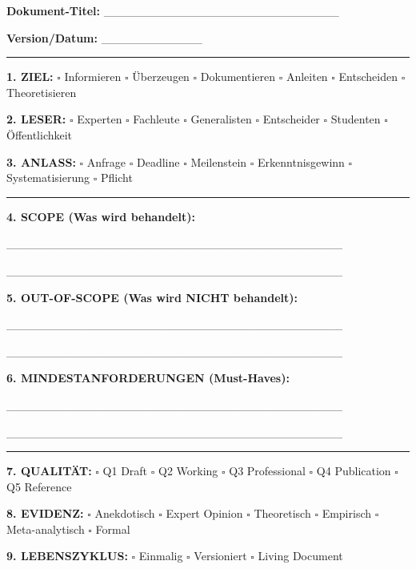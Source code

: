 \documentclass[12pt,a4paper]{article}
\begin{document}
\begin{tcolorbox}[colback=gray!10!white, colframe=black, 
    title=DOCUMENT SPECIFICATION CARD (Template)]

\textbf{Dokument-Titel:} \_\_\_\_\_\_\_\_\_\_\_\_\_\_\_\_\_\_\_\_\_\_\_\_\_\_\_\_

\textbf{Version/Datum:} \_\_\_\_\_\_\_\_\_\_\_\_

\rule{\textwidth}{0.3pt}

\textbf{1. ZIEL:} $\square$ Informieren $\square$ Überzeugen $\square$ Dokumentieren 
$\square$ Anleiten $\square$ Entscheiden $\square$ Theoretisieren

\textbf{2. LESER:} $\square$ Experten $\square$ Fachleute $\square$ Generalisten 
$\square$ Entscheider $\square$ Studenten $\square$ Öffentlichkeit

\textbf{3. ANLASS:} $\square$ Anfrage $\square$ Deadline $\square$ Meilenstein 
$\square$ Erkenntnisgewinn $\square$ Systematisierung $\square$ Pflicht

\rule{\textwidth}{0.3pt}

\textbf{4. SCOPE (Was wird behandelt):}

\_\_\_\_\_\_\_\_\_\_\_\_\_\_\_\_\_\_\_\_\_\_\_\_\_\_\_\_\_\_\_\_\_\_\_\_\_\_\_\_

\_\_\_\_\_\_\_\_\_\_\_\_\_\_\_\_\_\_\_\_\_\_\_\_\_\_\_\_\_\_\_\_\_\_\_\_\_\_\_\_

\textbf{5. OUT-OF-SCOPE (Was wird NICHT behandelt):}

\_\_\_\_\_\_\_\_\_\_\_\_\_\_\_\_\_\_\_\_\_\_\_\_\_\_\_\_\_\_\_\_\_\_\_\_\_\_\_\_

\_\_\_\_\_\_\_\_\_\_\_\_\_\_\_\_\_\_\_\_\_\_\_\_\_\_\_\_\_\_\_\_\_\_\_\_\_\_\_\_

\textbf{6. MINDESTANFORDERUNGEN (Must-Haves):}

\_\_\_\_\_\_\_\_\_\_\_\_\_\_\_\_\_\_\_\_\_\_\_\_\_\_\_\_\_\_\_\_\_\_\_\_\_\_\_\_

\_\_\_\_\_\_\_\_\_\_\_\_\_\_\_\_\_\_\_\_\_\_\_\_\_\_\_\_\_\_\_\_\_\_\_\_\_\_\_\_

\rule{\textwidth}{0.3pt}

\textbf{7. QUALITÄT:} $\square$ Q1 Draft $\square$ Q2 Working $\square$ Q3 Professional 
$\square$ Q4 Publication $\square$ Q5 Reference

\textbf{8. EVIDENZ:} $\square$ Anekdotisch $\square$ Expert Opinion $\square$ Theoretisch 
$\square$ Empirisch $\square$ Meta-analytisch $\square$ Formal

\textbf{9. LEBENSZYKLUS:} $\square$ Einmalig $\square$ Versioniert $\square$ Living Document


\end{tcolorbox}
\end{document}
